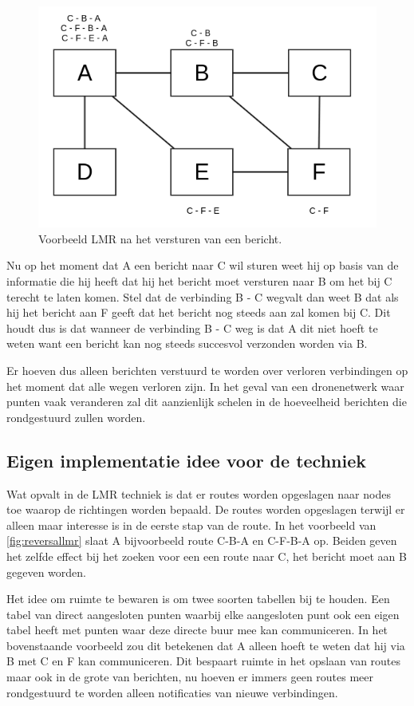 \documentclass[a4paper, 11pt, oneside]{report}
\begin{document}
\begin{figure}[H]
	\begin{center}\includegraphics[width=0.5\linewidth]{Afbeeldingen/reversal-table.png}\end{center}
	\caption{Voorbeeld LMR na het versturen van een bericht.}
	\label{fig:reversallmr}
\end{figure} 

Nu op het moment dat A een bericht naar C wil sturen weet hij op basis van de informatie die hij heeft dat hij het bericht moet versturen naar B om het bij C terecht te laten komen.
Stel dat de verbinding B - C wegvalt dan weet B dat als hij het bericht aan F geeft dat het bericht nog steeds aan zal komen bij C.
Dit houdt dus is dat wanneer de verbinding B - C weg is dat A dit niet hoeft te weten want een bericht kan nog steeds succesvol verzonden worden via B.

Er hoeven dus alleen berichten verstuurd te worden over verloren verbindingen op het moment dat alle wegen verloren zijn.
In het geval van een dronenetwerk waar punten vaak veranderen zal dit aanzienlijk schelen in de hoeveelheid berichten die rondgestuurd zullen worden.

\subsection{Eigen implementatie idee voor de techniek}

Wat opvalt in de LMR techniek is dat er routes worden opgeslagen naar nodes toe waarop de richtingen worden bepaald.
De routes worden opgeslagen terwijl er alleen maar interesse is in de eerste stap van de route. 
In het voorbeeld van \autoref{fig:reversallmr} slaat A bijvoorbeeld route C-B-A en C-F-B-A op. 
Beiden geven het zelfde effect bij het zoeken voor een een route naar C, het bericht moet aan B gegeven worden.

Het idee om ruimte te bewaren is om twee soorten tabellen bij te houden. Een tabel van direct aangesloten punten waarbij elke aangesloten punt ook een eigen tabel heeft met punten waar deze directe buur mee kan communiceren. In het bovenstaande voorbeeld zou dit betekenen dat A alleen hoeft te weten dat hij via B met C en F kan communiceren. Dit bespaart ruimte in het opslaan van routes maar ook in de grote van berichten, nu hoeven er immers geen routes meer rondgestuurd te worden alleen notificaties van nieuwe verbindingen.
\end{document}
